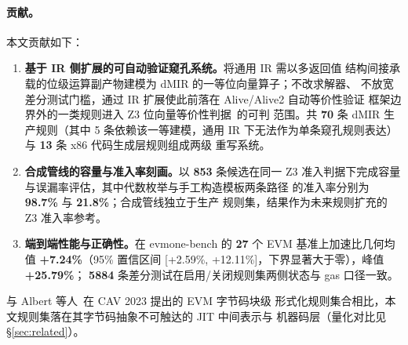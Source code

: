 \paragraph{贡献。}本文贡献如下：
\begin{enumerate}
  \item \textbf{基于 IR 侧扩展的可自动验证窥孔系统。}将通用 IR 需以多返回值
    结构间接承载的位级运算副产物建模为 dMIR 的一等位向量算子；不改求解器、
    不放宽差分测试门槛，通过 IR 扩展使此前落在 Alive/Alive2 自动等价性验证
    框架边界外的一类规则进入 Z3 位向量等价性判据~\cite{demoura2008z3}的可判
    范围。共 \textbf{70} 条 dMIR 生产规则（其中 5 条依赖该一等建模，通用 IR
    下无法作为单条窥孔规则表达）与 \textbf{13} 条 x86 代码生成层规则组成两级
    重写系统。
  \item \textbf{合成管线的容量与准入率刻画。}以 \textbf{853} 条候选在同一
    Z3 准入判据下完成容量与误漏率评估，其中代数枚举与手工构造模板两条路径
    的准入率分别为 \textbf{98.7\%} 与 \textbf{21.8\%}；合成管线独立于生产
    规则集，结果作为未来规则扩充的 Z3 准入率参考。
  \item \textbf{端到端性能与正确性。}在 evmone-bench 的 \textbf{27} 个 EVM
    基准上加速比几何均值 \textbf{+7.24\%}（95\% 置信区间
    [+2.59\%, +12.11\%]，下界显著大于零），峰值 \textbf{+25.79\%}；
    \textbf{5884} 条差分测试在启用/关闭规则集两侧状态与 gas 口径一致。
\end{enumerate}

与 Albert 等人~\cite{verified_evm_cav23}在 CAV 2023 提出的 EVM 字节码块级
形式化规则集合相比，本文规则集落在其字节码抽象不可触达的 JIT 中间表示与
机器码层（量化对比见 §\ref{sec:related}）。
